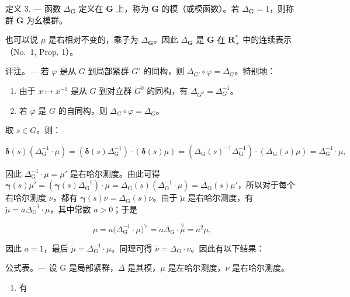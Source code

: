 定义 3. --- 函数 \(\Delta_{\mathbf{G}}\) 定义在 \(\mathbf{G}\) 上，称为 \(\mathbf{G}\) 的模（或模函数）。若 \(\Delta_{\mathbf{G}} = 1\)，则称群 \(\mathbf{G}\) 为幺模群。

也可以说 \(\mu\) 是右相对不变的，乘子为 \(\Delta_{\mathbf{G}}\)。因此 \(\Delta_{\mathbf{G}}\) 是 \(\mathbf{G}\) 在 \(\mathbf{R}_{+}^{*}\) 中的连续表示（No.~1, Prop. 1）。

评注。--- 若 \(\varphi\) 是从 \(G\) 到局部紧群 \(G'\) 的同构，则 \(\Delta_{G'} \circ \varphi = \Delta_G\)。特别地：

\begin{enumerate}
\def\labelenumi{\arabic{enumi})}
\item
  由于 \(x \mapsto x^{-1}\) 是从 \(G\) 到对立群 \(G^0\) 的同构，有 \(\Delta_{G^0} = \Delta_{G}^{-1}\)。
\item
  若 \(\varphi\) 是 \(G\) 的自同构，则 \(\Delta_G \circ \varphi = \Delta_G\)。
\end{enumerate}

取 \(s \in G\)。则：

\[
\boldsymbol {\delta} (s) \left(\Delta_ {\mathrm{G}} ^ {- 1} \cdot \mu\right) = \left(\boldsymbol {\delta} (s) \Delta_ {\mathrm{G}} ^ {- 1}\right) \cdot \left(\boldsymbol {\delta} (s) \mu\right) = \left(\Delta_ {\mathrm{G}} (s) ^ {- 1} \Delta_ {\mathrm{G}} ^ {- 1}\right) \cdot \left(\Delta_ {\mathrm{G}} (s) \mu\right) = \Delta_ {\mathrm{G}} ^ {- 1} \cdot \mu ,
\]

因此 \(\Delta_{\mathrm{G}}^{-1} \cdot \mu = \mu'\) 是右哈尔测度。由此可得 \(\boldsymbol{\gamma}(s)\mu' = (\boldsymbol{\gamma}(s)\Delta_{\mathrm{G}}^{-1}) \cdot \mu = \Delta_{\mathrm{G}}(s)(\Delta_{\mathrm{G}}^{-1} \cdot \mu) = \Delta_{\mathrm{G}}(s)\mu'\)，所以对于每个右哈尔测度 \(\nu\)，都有 \(\boldsymbol{\gamma}(s)\nu = \Delta_{\mathrm{G}}(s)\nu\)。由于 \(\breve{\mu}\) 是右哈尔测度，有 \(\breve{\mu} = a\Delta_{\mathrm{G}}^{-1} \cdot \mu\)，其中常数 \(a > 0\)；于是

\[
\mu = a \big (\Delta_ {\mathrm{G}} ^ {- 1} \cdot \mu \big) ^ {\vee} = a \Delta_ {\mathrm{G}} \cdot \stackrel {\vee} {\mu} = a ^ {2} \mu ,
\]

因此 \(a = 1\)，最后 \(\check{\mu} = \Delta_{\mathrm{G}}^{-1}\cdot \mu\)。同理可得 \(\check{\nu} = \Delta_{\mathrm{G}}\cdot \nu\)。因此有以下结果：

公式表。--- 设 G 是局部紧群，\(\Delta\) 是其模，\(\mu\) 是左哈尔测度，\(\nu\) 是右哈尔测度。

\begin{enumerate}
\def\labelenumi{\arabic{enumi})}
\tightlist
\item
  有
\end{enumerate}

